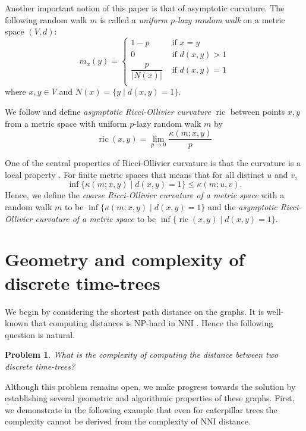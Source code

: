 \documentclass{amsart}
\newtheorem{problem}[lemma]{Problem}
\theoremstyle{definition}
\newcommand{\nni}{\mathrm{NNI}}
\newcommand{\ric}{\operatorname{ric}}
\begin{document}
{Another important notion of this paper is that of asymptotic curvature.
The following random walk $m$ is called a \emph{uniform $p$-lazy random walk} on a metric space $(V,d)$:
\[
m_x(y) =
\begin{cases}
1-p			& \mbox{ if } x=y \\
0   			& \mbox{ if } d(x,y) > 1 \\
\dfrac{p}{|N(x)|}	& \mbox{ if } d(x,y) = 1 \\
\end{cases}
\]
where $x,y \in V$ and $N(x) = \{y \mid d(x,y) = 1\}$.

We follow \textcite{Loisel2014-gu} and define \emph{asymptotic Ricci-Ollivier curvature} $\ric$ between points $x,y$ from a metric space with uniform $p$-lazy random walk $m$ by
\[
\ric(x,y) = \lim_{p\to0} \frac{\kappa(m;x,y)}{p}
\]

One of the central properties of Ricci-Ollivier curvature is that the curvature is a local property \autocite{Ollivier2009-cj}.
For finite metric spaces that means that for all distinct $u$ and $v$,
\[
\inf\{\kappa(m;x,y)\mid d(x,y) = 1\} \leq \kappa(m;u,v).
\]
Hence, we define the \emph{coarse Ricci-Ollivier curvature of a metric space} with a random walk $m$ to be $\inf\{\kappa(m;x,y)\mid d(x,y) = 1\}$ and the \emph{asymptotic Ricci-Ollivier curvature of a metric space} to be $\inf\{\ric(x,y)\mid d(x,y) = 1\}$.
}{}


\section{Geometry and complexity of discrete time-trees}

We begin by considering the shortest path distance on the graphs.
It is well-known that computing distances is NP-hard in $\nni$ \autocite{Dasgupta2000-xa}.
Hence the following question is natural.

\begin{problem}
What is the complexity of computing the distance between two discrete time-trees?
\end{problem}

Although this problem remains open, we make progress towards the solution by establishing several geometric and algorithmic properties of these graphs.
First, we demonstrate in the following example that even for caterpillar trees the complexity cannot be derived from the complexity of $\nni$ distance.
\end{document}
